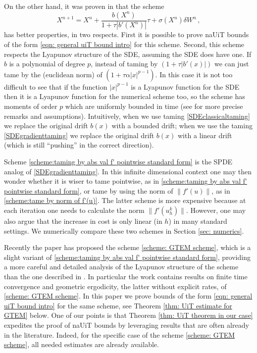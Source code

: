 \documentclass[reqno, 11pt]{amsart}
\theoremstyle{plain}
\theoremstyle{definition}
\theoremstyle{remark}
\numberwithin{equation}{section}
\numberwithin{theorem}{section}
\begin{document}
{On the other hand, it was proven in \cite[Section 5]{Angeli} that the scheme
\begin{equation}\label{SDEgradienttaming}
X^{n+1}=X^n+ \frac{b(X^n)}{1+\tau |b'(X^n)|} \tau + \sigma(X^n) \delta W^n \,, 
\end{equation}
has better properties, in two respects.  First it is possible to prove naUiT bounds of the form \eqref{eqn: general uiT bound intro} for this scheme.  Second, this scheme respects the Lyapunov structure of the SDE, assuming the SDE does have one.  If $b$ is a polynomial of degree $p$, instead of taming by $(1+ \tau |b'(x)|)$ we can just tame by the (euclidean norm) of $(1+ \tau \alpha |x|^{p-1})$. In this case it is not too difficult to see that  if the function $|x|^{p-1}$ is a Lyapunov function for the SDE then it is a Lyapunov function for the numerical scheme too, so the scheme has moments of order $p$ which are uniformly bounded in time (see \cite[Note 5.2]{Angeli} for more precise remarks and assumptions). Intuitively, when we use taming \eqref{SDEclassicaltaming} we replace the original drift $b(x)$ with a bounded drift;  when we use the taming \eqref{SDEgradienttaming} we replace the original drift $b(x)$ with a linear drift (which is still ``pushing'' in the correct direction).


Scheme \eqref{scheme:taming by abs val f' pointwise standard form} is the SPDE analog of \eqref{SDEgradienttaming}. In this infinite dimensional context one may then wonder whether it is wiser to tame pointwise, as in \eqref{scheme:taming by abs val f' pointwise standard form}, or tame by using the norm of $\|f'(u)\|$, as in \eqref{scheme:tame by norm of f'(u)}. The latter scheme is more expensive because at each iteration one needs to calculate the norm $\|f'(u_h^k)\|$. However, one may also argue that the increase in cost is only linear (in $h$) in many standard settings. We numerically compare these two schemes in Section \ref{sec: numerics}.

Recently the paper \cite{liu2025geometric} has proposed the scheme \eqref{scheme: GTEM scheme}, which is a slight variant of \eqref{scheme:taming by abs val f' pointwise standard form}, providing a more careful and detailed analysis of the Lyapunov structure of the scheme than the one described in \cite{Angeli}. In particular the work \cite{liu2025geometric} contains results on finite time convergence and geometric ergodicity, the latter  without explicit rates,   of \eqref{scheme: GTEM scheme}. In this paper we prove bounds of the form \eqref{eqn: general uiT bound intro} for the same scheme, see Theorem  \ref{thm: UiT estimate for GTEM} below.  One of our points is that Theorem \ref{thm: UiT theorem in our case} expedites the proof of naUiT bounds by leveraging results that are often already in the literature. Indeed, for the specific case of the scheme \eqref{scheme: GTEM scheme}, all needed estimates are already available.

}
\end{document}
